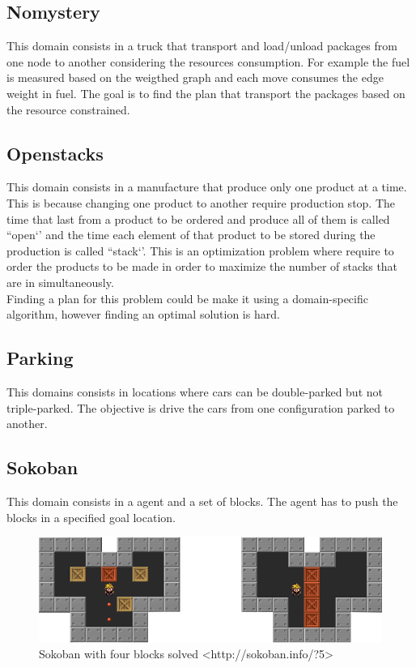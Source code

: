 \subsection{Nomystery}
This domain consists in a truck that transport and load/unload packages from one node to another considering the resources consumption. For example the fuel is measured based on the weigthed graph and each move consumes the edge weight in fuel. The goal is to find the plan that transport the packages based on the resource constrained.\\

\subsection{Openstacks}
This domain consists in a manufacture that produce only one product at a time. This is because changing one product to another require production stop. The time that last from a product to be ordered and produce all of them is called ``open‘’ and the time each element of that product to be stored during the production is called ``stack‘’. This is an optimization problem where require to order the products to be made in order to maximize the number of stacks that are in simultaneously.\\

Finding a plan for this problem could be make it using a domain-specific algorithm, however finding an optimal solution is hard.\\  

\subsection{Parking}
This domains consists in locations where cars can be double-parked but not triple-parked. The objective is drive the cars from one configuration parked to another.\\

\subsection{Sokoban}
This domain consists in a agent and a set of blocks. The agent has to push the blocks in a specified goal location.

\begin{figure}[!htb]
\begin{center}
  \includegraphics[width=12cm,scale=0.5]{images/sokoban_star_end}
\end{center}
\caption{Sokoban with four blocks solved <http://sokoban.info/?5>}\label{fig:img_sokoban_solved}
\end{figure}

